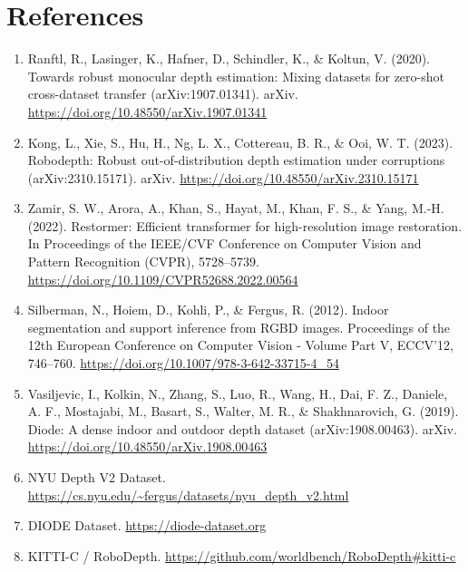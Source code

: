 \documentclass[10pt]{article}
\begin{document}
\section{References}

\begin{enumerate}[leftmargin=*]

\item Ranftl, R., Lasinger, K., Hafner, D., Schindler, K., \& Koltun, V. (2020). Towards robust monocular depth estimation: Mixing datasets for zero-shot cross-dataset transfer (arXiv:1907.01341). arXiv. \url{https://doi.org/10.48550/arXiv.1907.01341}

\item Kong, L., Xie, S., Hu, H., Ng, L. X., Cottereau, B. R., \& Ooi, W. T. (2023). Robodepth: Robust out-of-distribution depth estimation under corruptions (arXiv:2310.15171). arXiv. \url{https://doi.org/10.48550/arXiv.2310.15171}

\item Zamir, S. W., Arora, A., Khan, S., Hayat, M., Khan, F. S., \& Yang, M.-H. (2022). Restormer: Efficient transformer for high-resolution image restoration. In Proceedings of the IEEE/CVF Conference on Computer Vision and Pattern Recognition (CVPR), 5728--5739. \url{https://doi.org/10.1109/CVPR52688.2022.00564}

\item Silberman, N., Hoiem, D., Kohli, P., \& Fergus, R. (2012). Indoor segmentation and support inference from RGBD images. Proceedings of the 12th European Conference on Computer Vision - Volume Part V, ECCV’12, 746--760. \url{https://doi.org/10.1007/978-3-642-33715-4_54}

\item Vasiljevic, I., Kolkin, N., Zhang, S., Luo, R., Wang, H., Dai, F. Z., Daniele, A. F., Mostajabi, M., Basart, S., Walter, M. R., \& Shakhnarovich, G. (2019). Diode: A dense indoor and outdoor depth dataset (arXiv:1908.00463). arXiv. \url{https://doi.org/10.48550/arXiv.1908.00463}

\item NYU Depth V2 Dataset. \url{https://cs.nyu.edu/~fergus/datasets/nyu_depth_v2.html}

\item DIODE Dataset. \url{https://diode-dataset.org}

\item KITTI-C / RoboDepth. \url{https://github.com/worldbench/RoboDepth#kitti-c}

\end{enumerate}
\end{document}
